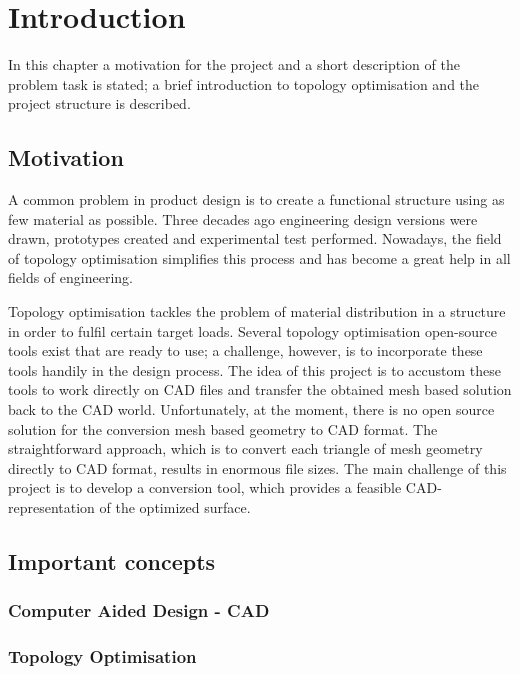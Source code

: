 \chapter{Introduction}
\label{chapter:Introduction}

In this chapter a motivation for the project and a short description of the problem task is stated; a brief introduction to topology optimisation and the project structure is described.
\section{Motivation}
A common problem in product design is to create a functional structure using as few material as possible. Three decades ago engineering design versions were drawn, prototypes created and experimental test performed. Nowadays, the field of topology optimisation simplifies this process and has become a great help in all fields of engineering. 

Topology optimisation tackles the problem of material distribution in a structure in order to fulfil certain target loads. Several topology optimisation open-source tools exist that are ready to use; a challenge, however, is to incorporate these tools handily in the design process. The idea of this project is to accustom these tools to work directly on CAD files and transfer the obtained mesh based solution back to the CAD world. Unfortunately, at the moment, there is no open source solution for the conversion mesh based geometry to CAD format. The straightforward approach, which is to convert each triangle of mesh geometry directly to CAD format, results in enormous file sizes. The main challenge of this project is to develop a conversion tool, which provides a feasible CAD-representation of the optimized surface. 

\section{Important concepts}

\subsection{Computer Aided Design - CAD}

\subsection{Topology Optimisation}

